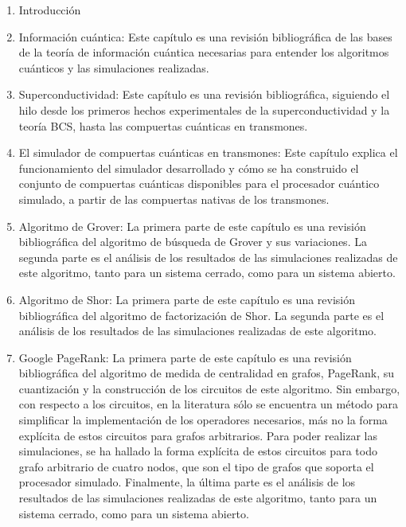 \begin{enumerate}
    \item Introducción

    \item Información cuántica: Este capítulo es una revisión bibliográfica de las bases de la teoría de información cuántica necesarias para entender los algoritmos cuánticos y las simulaciones realizadas.

    \item Superconductividad: Este capítulo es una revisión bibliográfica, siguiendo el hilo desde los primeros hechos experimentales de la superconductividad y la teoría BCS, hasta las compuertas cuánticas en transmones.

    \item El simulador de compuertas cuánticas en transmones: Este capítulo explica el funcionamiento del simulador desarrollado y cómo se ha construido el conjunto de compuertas cuánticas disponibles para el procesador cuántico simulado, a partir de las compuertas nativas de los transmones.

    \item Algoritmo de Grover: La primera parte de este capítulo es una revisión bibliográfica del algoritmo de búsqueda de Grover y sus variaciones. La segunda parte es el análisis de los resultados de las simulaciones realizadas de este algoritmo, tanto para un sistema cerrado, como para un sistema abierto.

    \item Algoritmo de Shor: La primera parte de este capítulo es una revisión bibliográfica del algoritmo de factorización de Shor. La segunda parte es el análisis de los resultados de las simulaciones realizadas de este algoritmo.

    \item Google PageRank: La primera parte de este capítulo es una revisión bibliográfica del algoritmo de medida de centralidad en grafos, PageRank, su cuantización y la construcción de los circuitos de este algoritmo. Sin embargo, con respecto a los circuitos, en la literatura sólo se encuentra un método para simplificar la implementación de los operadores necesarios, más no la forma explícita de estos circuitos para grafos arbitrarios. Para poder realizar las simulaciones, se ha hallado la forma explícita de estos circuitos para todo grafo arbitrario de cuatro nodos, que son el tipo de grafos que soporta el procesador simulado. Finalmente, la última parte es el análisis de los resultados de las simulaciones realizadas de este algoritmo, tanto para un sistema cerrado, como para un sistema abierto.


\end{enumerate}
